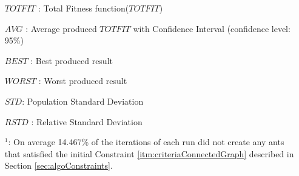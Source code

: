 \begin{sidewaystable}
\begin{itemize}[noitemsep]
    \item[$TOTFIT$ :] Total Fitness function($TOTFIT$)
    \item[$AVG$ :] Average produced $TOTFIT$ with Confidence Interval (confidence level: 95\%)
    \item[$BEST$ :] Best produced result
    \item[$WORST$ :] Worst produced result
    \item[$STD$:] Population Standard Deviation 
    \item[$RSTD$ :] Relative Standard Deviation 
    \item[$^1$:] On average 14.467\% of the iterations of each run did not create any ants that satisfied the initial Constraint \ref{itm:criteriaConnectedGraph} described in Section \vref{sec:algoConstraints}.
    \end{itemize}
    \label{table:pm1}
\end{sidewaystable}

